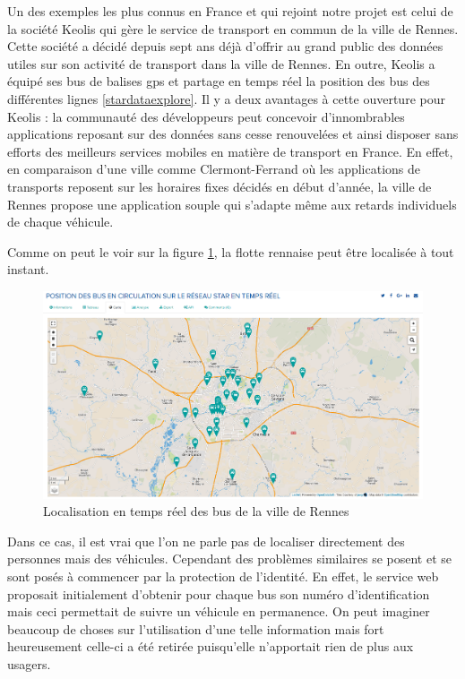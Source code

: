 Un des exemples les plus connus en France et qui rejoint notre projet est celui de la société Keolis qui gère le service de transport en commun de la ville de Rennes. Cette société a décidé depuis sept ans déjà d’offrir au grand public des données utiles sur son activité de transport dans la ville de Rennes. En outre, Keolis a équipé ses bus de balises gps et partage en temps réel la position des bus des différentes lignes \ref{stardataexplore}. Il y a deux avantages à cette ouverture pour Keolis : la communauté des développeurs peut concevoir d’innombrables applications reposant sur des données sans cesse renouvelées et ainsi disposer sans efforts des meilleurs services mobiles en matière de transport en France. En effet, en comparaison d’une ville comme Clermont-Ferrand où les applications de transports reposent sur les horaires fixes décidés en début d’année, la ville de Rennes propose une application souple qui s’adapte même aux retards individuels de chaque véhicule.

Comme on peut le voir sur la figure \ref{rennes}, la flotte rennaise peut être localisée à tout instant.

\begin{figure}[H]
    \centering
    \includegraphics[width=\textwidth]{./img/rennes.png}
    \caption{Localisation en temps réel des bus de la ville de Rennes}
    \label{rennes}
\end{figure}

Dans ce cas, il est vrai que l’on ne parle pas de localiser directement des personnes mais des véhicules. Cependant des problèmes similaires se posent et se sont posés à commencer par la protection de l’identité. En effet, le service web proposait initialement d’obtenir pour chaque bus son numéro d’identification mais ceci permettait de suivre un véhicule en permanence. On peut imaginer beaucoup de choses sur l’utilisation d’une telle information mais fort heureusement celle-ci a été retirée puisqu’elle n’apportait rien de plus aux usagers.

